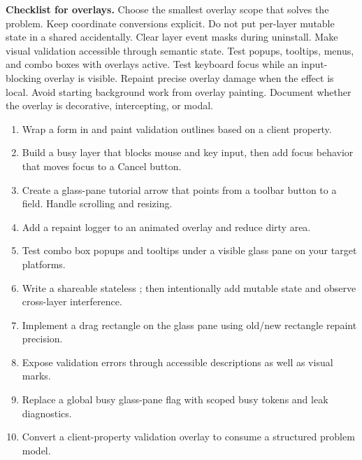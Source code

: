 \textbf{Checklist for overlays.} Choose the smallest overlay scope that solves the problem. Keep coordinate conversions explicit. Do not put per-layer mutable state in a shared  accidentally. Clear layer event masks during uninstall. Make visual validation accessible through semantic state. Test popups, tooltips, menus, and combo boxes with overlays active. Test keyboard focus while an input-blocking overlay is visible. Repaint precise overlay damage when the effect is local. Avoid starting background work from overlay painting. Document whether the overlay is decorative, intercepting, or modal.

\begin{exercisebox}
\begin{enumerate}
\item Wrap a form in  and paint validation outlines based on a  client property.
\item Build a busy layer that blocks mouse and key input, then add focus behavior that moves focus to a Cancel button.
\item Create a glass-pane tutorial arrow that points from a toolbar button to a field. Handle scrolling and resizing.
\item Add a repaint logger to an animated overlay and reduce dirty area.
\item Test combo box popups and tooltips under a visible glass pane on your target platforms.
\item Write a shareable stateless ; then intentionally add mutable state and observe cross-layer interference.
\item Implement a drag rectangle on the glass pane using old/new rectangle repaint precision.
\item Expose validation errors through accessible descriptions as well as visual marks.
\item Replace a global busy glass-pane flag with scoped busy tokens and leak diagnostics.
\item Convert a client-property validation overlay to consume a structured problem model.
\end{enumerate}
\end{exercisebox}
